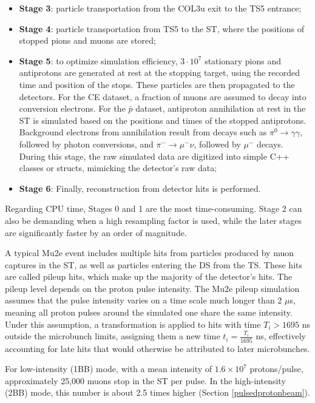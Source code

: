 \begin{itemize}
    \item \textbf{Stage 3}: particle transportation from the COL3u exit to the TS5 entrance;

    \item \textbf{Stage 4}: particle transportation from TS5 to the ST, 
    where the positions of stopped pions and muons are stored;

    \item \textbf{Stage 5}: to optimize simulation efficiency, $3 \cdot 10^7$ 
    stationary pions and antiprotons are generated at rest at the stopping 
    target, using the recorded time and position of the stops. These particles 
    are then propagated to the detectors. For the CE dataset, a fraction of muons 
    are assumed to decay into conversion electrons. For the $\bar{p}$ dataset, 
    antiproton annihilation at rest in the ST is simulated based on the positions 
    and times of the stopped antiprotons. Background electrons from annihilation 
    result from decays such as $\pi^0 \to \gamma \gamma$, followed by photon 
    conversions, and $\pi^- \to \mu^- \nu$, followed by $\mu^-$ decays. During 
    this stage, the raw simulated data are digitized into simple C++ classes or 
    structs, mimicking the detector's raw data;

    \item \textbf{Stage 6}: Finally, reconstruction from detector hits is performed.
\end{itemize}

Regarding CPU time, Stages 0 and 1 are the most time-consuming. 
Stage 2 can also be demanding when a high resampling factor is used, 
while the later stages are significantly faster by an order of magnitude.

A typical Mu2e event includes multiple hits from particles produced 
by muon captures in the ST, as well as particles entering the DS from 
the TS. These hits are called pileup hits, which make 
up the majority of the detector's hits. The pileup level 
depends on the proton pulse intensity. The Mu2e pileup 
simulation assumes that the pulse intensity varies on a 
time scale much longer than 2 $\mu$s, meaning all proton 
pulses around the simulated one share the same intensity. 
Under this assumption, a transformation is applied to hits 
with time $T_i > 1695$ ns outside the microbunch limits, 
assigning them a new time $t_i = \frac{T_i}{1695}$ ns, 
effectively accounting for late hits that would otherwise 
be attributed to later microbunches. 

For low-intensity (1BB) mode, with a mean intensity of 
$1.6 \times 10^7$ protons/pulse, approximately 25,000 
muons stop in the ST per pulse. In the high-intensity 
(2BB) mode, this number is about 2.5 times higher (Section \ref{pulsedprotonbeam}).


